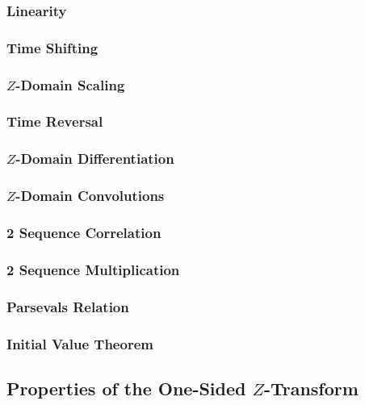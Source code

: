 \subsubsection{Linearity}\label{subsubsec:Linearity}
\subsubsection{Time Shifting}\label{subsubsec:Time Shifting}
\subsubsection{\texorpdfstring{$Z$-Domain}{Z-Domain} Scaling}\label{subsubsec:Z-Domain Scaling}
\subsubsection{Time Reversal}\label{subsubsec:Time Reversal}
\subsubsection{\texorpdfstring{$Z$-Domain}{Z-Domain} Differentiation}\label{subsubsec:Z-Domain Differentiation}
\subsubsection{\texorpdfstring{$Z$-Domain}{Z-Domain} Convolutions}\label{subsubsec:Z-Domain Convolutions}
\subsubsection{2 Sequence Correlation}\label{subsubsec:2 Sequence Correlation}
\subsubsection{2 Sequence Multiplication}\label{subsubsec:2 Sequence Multiplication}
\subsubsection{Parsevals Relation}\label{subsubsec:Parsevals Relation}
\subsubsection{Initial Value Theorem}\label{subsubsec:Initial Value Theorem}

\subsection{Properties of the One-Sided \texorpdfstring{$Z$-Transform}{Z-Transform}}\label{subsec:One-Sided Z-Transform Properties}
\begin{propertylist}
\item 
\end{propertylist}

